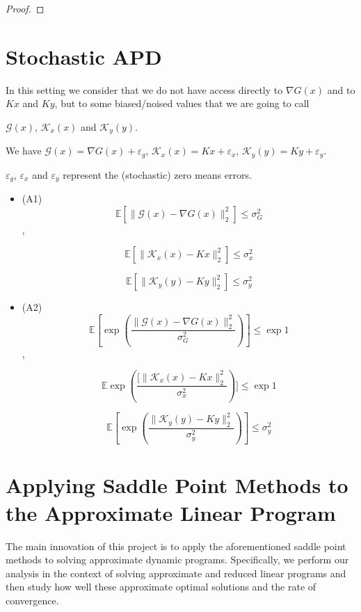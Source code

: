 \documentclass[12pt,reqno]{amsart}
\numberwithin{equation}{section}
\begin{document}
\begin{proof}

\end{proof}

\section{Stochastic APD}

In this setting we consider that we do not have access directly to $\nabla G(x)$ and to $Kx$ and $Ky$, but to some biased/noised values that we are going to call

$\mathcal{G}(x)$, $\mathcal{K}_{x}(x)$ and $\mathcal{K}_{y}(y)$.

We have $\mathcal{G}(x) = \nabla G(x) + \varepsilon_{g}$, $\mathcal{K}_{x}(x) = Kx + \varepsilon_{x}$, $\mathcal{K}_{y}(y) = Ky + \varepsilon_{y}$.

$\varepsilon_{g}$, $\varepsilon_{x}$ and $\varepsilon_{y}$ represent the (stochastic) zero means errors.


\begin{itemize}


\item (A1) $$\mathbb{E}[\lVert \mathcal{G}(x) - \nabla G(x) \rVert_{2}^{2}] \leq \sigma_{G}^{2}$$,

$$\mathbb{E}[\lVert \mathcal{K}_{x}(x) - Kx \rVert_{2}^{2}] \leq \sigma_{x}^{2}$$

$$\mathbb{E}[\lVert \mathcal{K}_{y}(y) - Ky \rVert_{2}^{2}] \leq \sigma_{y}^{2}$$

\item (A2) $$\mathbb{E}[\exp(\frac{\lVert \mathcal{G}(x) - \nabla G(x) \rVert_{2}^{2}}{\sigma_{G}^{2}})] \leq \exp{1}$$,

$$\mathbb{E}\exp(\frac{[\lVert \mathcal{K}_{x}(x) - Kx \rVert_{2}^{2}}{\sigma_{x}^{2}})] \leq \exp{1}$$

$$\mathbb{E}[\exp(\dfrac{\lVert \mathcal{K}_{y}(y) - Ky \rVert_{2}^{2}}{\sigma_{y}^{2}})] \leq \sigma_{y}^{2}$$
\end{itemize}


\section{Applying Saddle Point Methods to the Approximate Linear Program}

The main innovation of this project is to apply the aforementioned saddle point methods to solving approximate dynamic programs. Specifically, we perform our analysis in the context of solving approximate and reduced linear programs and then study how well these approximate optimal solutions and the rate of convergence.
\end{document}
